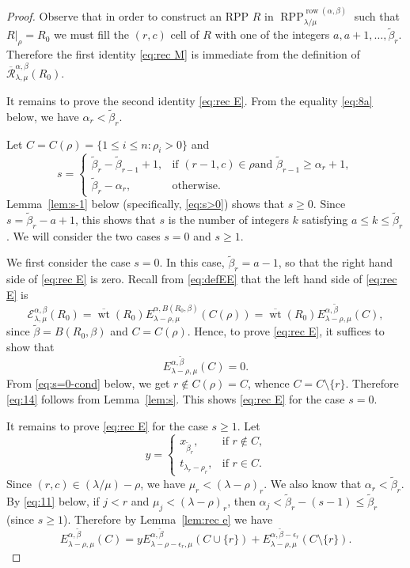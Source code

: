 \documentclass[12pt]{amsart}
\numberwithin{equation}{section}
\theoremstyle{definition}
\newcommand\wb{\widetilde{\beta}}
\newcommand\row{\operatorname{row}}
\newcommand\RPP{\operatorname{RPP}}
\newcommand\lm{{\lambda/\mu}}
\newcommand\wt{\operatorname{wt}}
\newcommand\R{\mathcal{R}}
\newcommand\oR{\overline{\R}}
\newcommand\EE{\mathcal{E}}
\newcommand\owt{\overline{\wt}}
\begin{document}
\begin{proof}
  Observe that in order to construct an RPP $R$ in
  $\RPP^{\row(\alpha,\beta)}_\lm$ such that $R|_\rho=R_0$ we must fill the
  $(r,c)$ cell of $R$ with one of the integers $a,a+1,\dots,\wb_r$. Therefore
  the first identity \eqref{eq:rec M} is immediate from the definition of
  $\oR^{\alpha,\beta}_{\lambda,\mu}(R_0)$.

  It remains to prove the second identity \eqref{eq:rec E}.
  From the equality \eqref{eq:8a} below, we have $\alpha_r < \wb_r$.

  Let $C=C(\rho)=\{1\le i\le n:
  \rho_i>0\}$ and
    \begin{equation}\label{eq:s}
s = \begin{cases}
  \wb_r-\wb_{r-1}+1, & \mbox{if $(r-1,c)\in\rho$
  and $\wb_{r-1}\ge\alpha_r+1$} ,\\
\wb_r-\alpha_r, &\mbox{otherwise} .
\end{cases}
  \end{equation}
  Lemma~\ref{lem:s-1} below (specifically, \eqref{eq:s>0})
  shows that $s\ge0$. Since $s = \wb_r - a + 1$, this
  shows that $s$ is the number of integers $k$ satisfying $a\le k\le \wb_r$. We
  will consider the two cases $s=0$ and $s\ge1$.

  We first consider the case $s=0$. In this case, $\wb_r = a-1$,
  so that the right hand side of
  \eqref{eq:rec E} is zero. Recall from \eqref{eq:defEE} that the left
  hand side of \eqref{eq:rec E} is
  \[
    \EE_{\lambda,\mu}^{\alpha,\beta}(R_0) = \owt(R_0)
    E_{\lambda-\rho,\mu}^{\alpha,B(R_0,\beta)}(C(\rho)) = \owt(R_0)
    E_{\lambda-\rho,\mu}^{\alpha,\wb}(C),
\]
since $\wb=B(R_0,\beta)$ and $C = C(\rho)$.
Hence, to prove \eqref{eq:rec E}, it suffices to show that
  \begin{equation}
    \label{eq:14}
  E_{\lambda-\rho,\mu}^{\alpha,\wb}(C) = 0.
  \end{equation}
  From \eqref{eq:s=0-cond} below, we get $r \notin C(\rho) = C$,
  whence $C=C\setminus\{r\}$.
Therefore \eqref{eq:14} follows from Lemma~\ref{lem:s}.
This shows \eqref{eq:rec E} for the case $s=0$.

It remains to prove \eqref{eq:rec E} for the case $s\ge1$. Let
\[
y =
\begin{cases}
  x_{\wb_r}, &\mbox{if $r\not\in C$,}\\
  t_{\lambda_r-\rho_r}, &\mbox{if $r\in C$.}
\end{cases}
\]
Since $(r,c)\in(\lm)-\rho$, we have $\mu_r<(\lambda-\rho)_r$.
We also know that $\alpha_r<\wb_r$. By \eqref{eq:11} below,
if $j<r$ and
$\mu_j<(\lambda-\rho)_r$, then $\alpha_j<\wb_r-(s-1) \le \wb_r$
(since $s \ge 1$). Therefore by
Lemma~\ref{lem:rec e} we have
\begin{equation}\label{eq:e=ye+e}
   E^{\alpha,\wb}_{\lambda-\rho,\mu}(C)
   = y E^{\alpha,\wb}_{\lambda-\rho-\epsilon_r,\mu}(C\cup\{r\})
       +E_{\lambda-\rho,\mu}^{\alpha,\wb-\epsilon_r}(C\setminus\{r\}).
\end{equation}


\end{proof}
\end{document}
